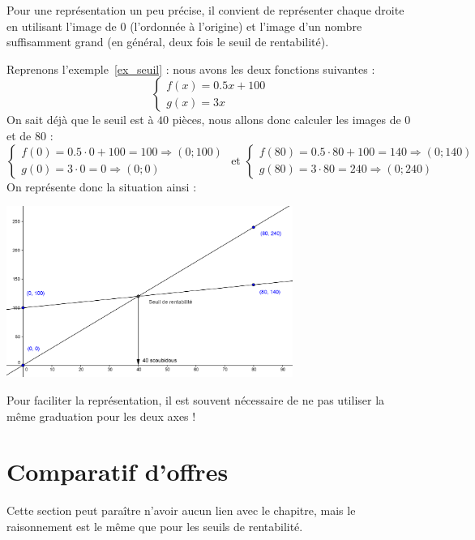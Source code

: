 Pour une représentation un peu précise, il convient de représenter chaque droite en utilisant l'image de $0$ (l'ordonnée à l'origine) et l'image d'un nombre suffisamment grand (en général, deux fois le seuil de rentabilité).

\begin{exemple}
Reprenons l'exemple~\ref{ex_seuil} : nous avons les deux fonctions suivantes :
$$
\left\{
\begin{array}{l}
f(x) = 0.5 x + 100\\
g(x) = 3x
\end{array}
\right.
$$
On sait déjà que le seuil est à $40$ pièces, nous allons donc calculer les images de $0$ et de $80$ :
$$
\left\{
\begin{array}{l}
f(0) = 0.5 \cdot 0 + 100 = 100 \Rightarrow (0;100)\\
g(0) = 3\cdot 0 = 0 \Rightarrow (0;0)
\end{array}
\right.
\mbox{ et }
\left\{
\begin{array}{l}
f(80) = 0.5 \cdot 80 + 100 = 140 \Rightarrow (0;140)\\
g(80) = 3\cdot 80 =240 \Rightarrow (0;240)
\end{array}
\right.
$$
On représente donc la situation ainsi :
\begin{center}
\includegraphics[width=0.7\textwidth]{rentabilite/seuil_ex.png}
\end{center}
Pour faciliter la représentation, il est souvent nécessaire de ne pas utiliser la même graduation pour les deux axes !
\end{exemple}

\section{Comparatif d'offres}

Cette section peut paraître n'avoir aucun lien avec le chapitre, mais le raisonnement est le même que pour les seuils de rentabilité.

